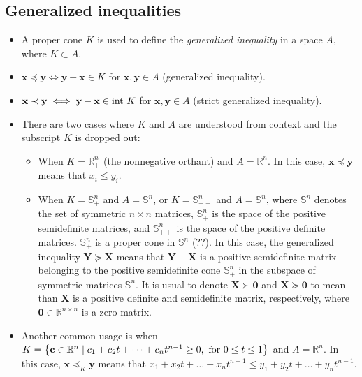 \documentclass{article}
\begin{document}
\subsection{Generalized inequalities}
\begin{itemize}
    \item A proper cone \(K\) is used to define the \textit{generalized inequality} in a space \(A\), where \(K \subset A\).
    \item \(\mathbf{x} \preceq \mathbf{y} \iff \mathbf{y} - \mathbf{x} \in K\) for \(\mathbf{x}, \mathbf{y} \in A\) (generalized inequality).
    \item \(\mathbf{x} \prec \mathbf{y} \iff \mathbf{y} - \mathbf{x} \in \textnormal{int }K\) for \(\mathbf{x}, \mathbf{y} \in A\) (strict generalized inequality).
    \item There are two cases where \(K\) and \(A\) are understood from context and the subscript \(K\) is dropped out:
    \begin{itemize}[label={$\triangleright$}]
        \item When \(K = \mathbb{R}^{n}_{+}\) (the nonnegative orthant) and \(A = \mathbb{R}^{n}\). In this case, \(\mathbf{x} \preceq \mathbf{y}\) means that \(x_i \leq y_i\).
        \item When \(K = \mathbb{S}^{n}_{+}\) and \(A = \mathbb{S}^{n}\), or \(K = \mathbb{S}^{n}_{++}\) and \(A = \mathbb{S}^{n}\), where \(\mathbb{S}^{n}\) denotes the set of symmetric \(n\times n\) matrices, \(\mathbb{S}^{n}_{+}\) is the space of the positive semidefinite matrices, and \(\mathbb{S}^{n}_{++}\) is the space of the positive definite matrices. \(\mathbb{S}^{n}_{+}\) is a proper cone in \(\mathbb{S}^{n}\) (??). In this case, the generalized inequality \(\mathbf{Y} \succeq \mathbf{X}\) means that \(\mathbf{Y}-\mathbf{X}\) is a positive semidefinite matrix belonging to the positive semidefinite cone \(\mathbb{S}^{n}_{+}\) in the subspace of symmetric matrices \(\mathbb{S}^{n}\). It is usual to denote \(\mathbf{X} \succ \mathbf{0}\) and \(\mathbf{X} \succeq \mathbf{0}\) to mean than \(\mathbf{X}\) is a positive definite and semidefinite matrix, respectively, where \(\mathbf{0} \in \mathbb{R}^{n\times n}\) is a zero matrix.
    \end{itemize}
    \item Another common usage is when \(K = \left\{ \mathbf{c} \in \mathbb{R}^{n} \mid c_1 + c_2 t + \dots + c_n t^{n-1} \geq 0, \textnormal{ for } 0\leq t\leq 1 \right\}\) and \(A = \mathbb{R}^{n}\). In this case, \(\mathbf{x} \preceq_K \mathbf{y}\) means that \(x_1 + x_2 t + \dots + x_n t^{n-1} \leq y_1 + y_2 t + \dots + y_n t^{n-1}\).

\end{itemize}
\end{document}
